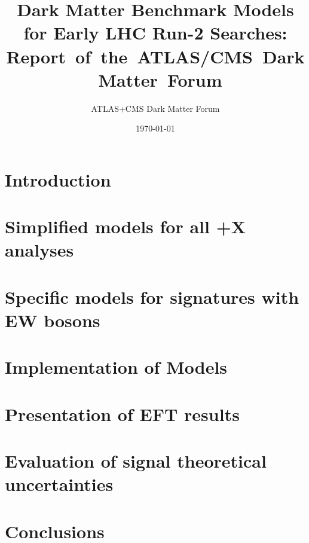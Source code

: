 \documentclass[a4paper,debug,notitlepage,nobib]{tufte-book}
\title{Dark Matter Benchmark Models for Early LHC Run-2 Searches:\\\noindent Report~of~the~ATLAS/CMS~Dark~Matter~Forum}
\author{ATLAS+CMS Dark Matter Forum}
\date{\today}
\begin{document}
\morefloats
\setcounter{secnumdepth}{3} %



\setcounter{tocdepth}{3}
\tableofcontents
 
\pagebreak

\chapter{Introduction}
\label{sec:Introduction}



\chapter{\texorpdfstring{Simplified models for all \MET+X analyses}{Simplified models for all MET+X analyses}}
\label{subsec:MonojetLikeModels}


\chapter{Specific models for signatures with EW bosons}
\label{subsec:EWSpecificModels}


\chapter{Implementation of Models}
\label{app:MonojetLikeModels_Appendix}


\chapter{Presentation of EFT results}
\label{sec:EFTValidity} 


\chapter{Evaluation of signal theoretical uncertainties}
\label{sec:TheoryUncertainties} 


\chapter{Conclusions}
\label{chapter:conclusions}

 

\end{document}
